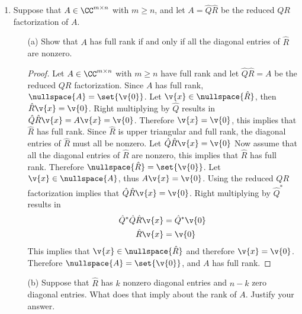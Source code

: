 \documentclass[11pt]{article}
\begin{document}
\begin{enumerate}
    \item %
        Suppose that $A \in \CC^{m \times n}$ with $m \ge n$, and let
        $A = \hat{Q}\hat{R}$ be the reduced $QR$ factorization of $A$.
        \begin{enumerate}
            \item[(a)] %
                Show that $A$ has full rank if and only if all the diagonal
                entries of $\hat{R}$ are nonzero.

                \begin{proof}
                    Let $A \in \CC^{m \times n}$ with $m \ge n$ have full rank
                    and let $\hat{Q}\hat{R} = A$ be  the reduced $QR$ factorization.
                    Since $A$ has full rank, $\nullspace{A} = \set{\v{0}}$.
                    Let $\v{x} \in \nullspace{\hat{R}}$, then
                    $\hat{R}\v{x} = \v{0}$.
                    Right multiplying by $\hat{Q}$ results in
                    $\hat{Q}\hat{R}\v{x} = A\v{x} = \v{0}$.
                    Therefore $\v{x} = \v{0}$, this implies that
                    $\hat{R}$ has full rank.
                    Since $\hat{R}$ is upper triangular and full rank, the
                    diagonal entries of $\hat{R}$ must all be nonzero.
                    Let $\hat{Q}\hat{R}\v{x} = \v{0}$
                    Now assume that all the diagonal entries of $\hat{R}$ are
                    nonzero, this implies that $\hat{R}$ has full rank.
                    Therefore $\nullspace{\hat{R}} = \set{\v{0}}$.
                    Let $\v{x} \in \nullspace{A}$, thus $A \v{x} = \v{0}$.
                    Using the reduced $QR$ factorization implies that
                    $\hat{Q}\hat{R} \v{x} = \v{0}$.
                    Right multiplying by $\hat{Q}^*$ results in
                    \begin{align*}
                        \hat{Q}^*\hat{Q}\hat{R} \v{x} &= \hat{Q}^*\v{0} \\
                        \hat{R}\v{x} &= \v{0}
                    \end{align*}
                    This implies that $\v{x} \in \nullspace{\hat{R}}$ and
                    therefore $\v{x} = \v{0}$.
                    Therefore $\nullspace{A} = \set{\v{0}}$, and $A$ has full
                    rank.
                \end{proof}

            \item[(b)]
                Suppose that $\hat{R}$ has $k$ nonzero diagonal entries and
                $n - k$ zero diagonal entries.
                What does that imply about the rank of $A$.
                Justify your answer.


\end{enumerate}
\end{enumerate}
\end{document}
